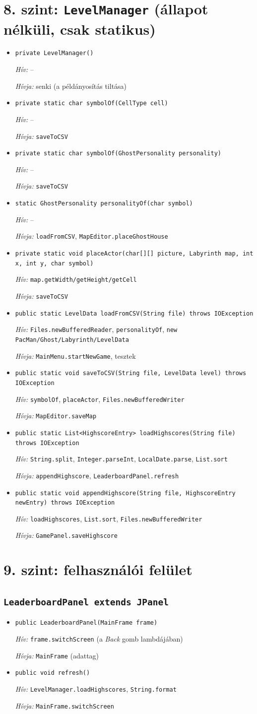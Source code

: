 \documentclass[10pt, a4paper]{article}
\newcommand{\fn}[3]{%
  \item \texttt{#1}\par
  {\small\textit{Hív:} #2\par\textit{Hívja:} #3}\vspace{3pt}}
\newcommand{\none}{--}
\begin{document}
\section{8. szint: \texttt{LevelManager} (állapot nélküli, csak statikus)}
\begin{itemize}
\fn{private LevelManager()}{\none}{senki (a példányosítás tiltása)}
\fn{private static char symbolOf(CellType cell)}{\none}{\texttt{saveToCSV}}
\fn{private static char symbolOf(GhostPersonality personality)}{\none}{\texttt{saveToCSV}}
\fn{static GhostPersonality personalityOf(char symbol)}{\none}{\texttt{loadFromCSV}, \texttt{MapEditor.placeGhostHouse}}
\fn{private static void placeActor(char[][] picture, Labyrinth map, int x, int y, char symbol)}{\texttt{map.getWidth/getHeight/getCell}}{\texttt{saveToCSV}}
\fn{public static LevelData loadFromCSV(String file) throws IOException}{\texttt{Files.newBufferedReader}, \texttt{personalityOf}, \texttt{new PacMan/Ghost/Labyrinth/LevelData}}{\texttt{MainMenu.startNewGame}, tesztek}
\fn{public static void saveToCSV(String file, LevelData level) throws IOException}{\texttt{symbolOf}, \texttt{placeActor}, \texttt{Files.newBufferedWriter}}{\texttt{MapEditor.saveMap}}
\fn{public static List<HighscoreEntry> loadHighscores(String file) throws IOException}{\texttt{String.split}, \texttt{Integer.parseInt}, \texttt{LocalDate.parse}, \texttt{List.sort}}{\texttt{appendHighscore}, \texttt{LeaderboardPanel.refresh}}
\fn{public static void appendHighscore(String file, HighscoreEntry newEntry) throws IOException}{\texttt{loadHighscores}, \texttt{List.sort}, \texttt{Files.newBufferedWriter}}{\texttt{GamePanel.saveHighscore}}
\end{itemize}

\section{9. szint: felhasználói felület}

\subsection*{\texttt{LeaderboardPanel extends JPanel}}
\begin{itemize}
\fn{public LeaderboardPanel(MainFrame frame)}{\texttt{frame.switchScreen} (a \textit{Back} gomb lambdájában)}{\texttt{MainFrame} (adattag)}
\fn{public void refresh()}{\texttt{LevelManager.loadHighscores}, \texttt{String.format}}{\texttt{MainFrame.switchScreen}}
\end{itemize}
\end{document}
